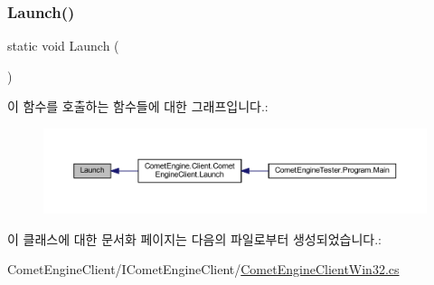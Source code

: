 \subsubsection{\texorpdfstring{Launch()}{Launch()}}
{\footnotesize\ttfamily static void Launch (\begin{DoxyParamCaption}{ }\end{DoxyParamCaption})}

이 함수를 호출하는 함수들에 대한 그래프입니다.\+:\nopagebreak
\begin{figure}[H]
\begin{center}
\leavevmode
\includegraphics[width=350pt]{class_comet_engine_1_1_client_1_1_comet_engine_client_win32_aee7b13887a71ba1fcd42c5fbccf124d4_icgraph}
\end{center}
\end{figure}


이 클래스에 대한 문서화 페이지는 다음의 파일로부터 생성되었습니다.\+:\begin{DoxyCompactItemize}
\item 
Comet\+Engine\+Client/\+I\+Comet\+Engine\+Client/\hyperlink{_comet_engine_client_win32_8cs}{Comet\+Engine\+Client\+Win32.\+cs}\end{DoxyCompactItemize}
